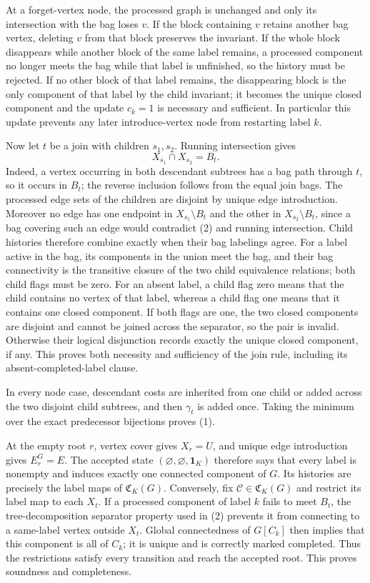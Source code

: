 At a forget-vertex node, the processed graph is unchanged and only its intersection with the bag loses \(v\).  If the block containing \(v\) retains another bag vertex, deleting \(v\) from that block preserves the invariant.  If the whole block disappears while another block of the same label remains, a processed component no longer meets the bag while that label is unfinished, so the history must be rejected.  If no other block of that label remains, the disappearing block is the only component of that label by the child invariant; it becomes the unique closed component and the update \(c_k=1\) is necessary and sufficient.  In particular this update prevents any later introduce-vertex node from restarting label \(k\).

Now let \(t\) be a join with children \(s_1,s_2\).  Running intersection gives
\[
 X_{s_1}\cap X_{s_2}=B_t.
\tag{2}
\]
Indeed, a vertex occurring in both descendant subtrees has a bag path through \(t\), so it occurs in \(B_t\); the reverse inclusion follows from the equal join bags.  The processed edge sets of the children are disjoint by unique edge introduction.  Moreover no edge has one endpoint in \(X_{s_1}\setminus B_t\) and the other in \(X_{s_2}\setminus B_t\), since a bag covering such an edge would contradict (2) and running intersection.  Child histories therefore combine exactly when their bag labelings agree.  For a label active in the bag, its components in the union meet the bag, and their bag connectivity is the transitive closure of the two child equivalence relations; both child flags must be zero.  For an absent label, a child flag zero means that the child contains no vertex of that label, whereas a child flag one means that it contains one closed component.  If both flags are one, the two closed components are disjoint and cannot be joined across the separator, so the pair is invalid.  Otherwise their logical disjunction records exactly the unique closed component, if any.  This proves both necessity and sufficiency of the join rule, including its absent-completed-label clause.

In every node case, descendant costs are inherited from one child or added across the two disjoint child subtrees, and then \(\gamma_t\) is added once.  Taking the minimum over the exact predecessor bijections proves (1).

At the empty root \(r\), vertex cover gives \(X_r=U\), and unique edge introduction gives \(E_r^G=E\).  The accepted state \((\varnothing,\varnothing,\mathbf 1_K)\) therefore says that every label is nonempty and induces exactly one connected component of \(G\).  Its histories are precisely the label maps of \(\mathfrak C_K(G)\).  Conversely, fix \(\mathcal C\in\mathfrak C_K(G)\) and restrict its label map to each \(X_t\).  If a processed component of label \(k\) fails to meet \(B_t\), the tree-decomposition separator property used in (2) prevents it from connecting to a same-label vertex outside \(X_t\).  Global connectedness of \(G[C_k]\) then implies that this component is all of \(C_k\); it is unique and is correctly marked completed.  Thus the restrictions satisfy every transition and reach the accepted root.  This proves soundness and completeness.

